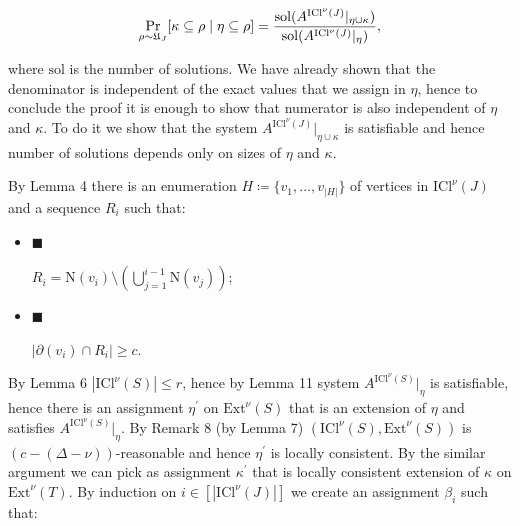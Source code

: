 \[\begin{gathered}
\Pr\limits_{\rho\sim\mathfrak{U}_{J}}[\kappa\subseteq\rho\mid\eta\subseteq\rho%
]=\frac{\mathrm{sol}(A^{\mathrm{ICl}^{\nu}\left(J\right)}|_{\eta\cup\kappa})}{%
\mathrm{sol}(A^{\mathrm{ICl}^{\nu}\left(J\right)}|_{\eta})},
\end{gathered}\]


where $\mathrm{sol}$ is the number of solutions. We have already shown that the denominator is
independent of the exact values that we assign in $\eta$, hence to conclude the proof it is enough to
show that numerator is also independent of $\eta$ and $\kappa$. To do it we show that the system
$A^{\mathrm{ICl}^{\nu}\left(J\right)}|_{\eta\cup\kappa}$ is satisfiable and hence number of solutions depends only
on sizes of $\eta$ and $\kappa$.\par




By Lemma 4 there is an enumeration $H\coloneqq\{v_{1},\dots,v_{|H|}\}$ of
vertices in $\mathrm{ICl}^{\nu}\left(J\right)$ and a sequence $R_{i}$ such that:\par


\begin{itemize}


\item[] 
$\blacksquare$ 


$R_{i}=\mathrm{N}\left(v_{i}\right)\setminus\left(\bigcup\limits_{j=1}^{i-1}%
\mathrm{N}\left(v_{j}\right)\right)$;\par





\item[] 
$\blacksquare$ 


$|\partial(v_{i})\cap R_{i}|\geq c$.\par





\end{itemize}




By Lemma 6 $|\mathrm{ICl}^{\nu}\left(S\right)|\leq r$, hence by Lemma 11
system $A^{\mathrm{ICl}^{\nu}\left(S\right)}|_{\eta}$ is satisfiable, hence there is an assignment $\eta^{\prime}$ on
$\mathrm{Ext}^{\nu}\left(S\right)$ that is an extension of $\eta$ and satisfies $A^{\mathrm{ICl}^{\nu}\left(S\right)}|_{\eta}$. By Remark
8 (by Lemma 7) $(\mathrm{ICl}^{\nu}\left(S\right),\mathrm{Ext}^{\nu}\left(S\right))$
is $(c-(\Delta-\nu))$-reasonable and hence $\eta^{\prime}$ is locally consistent. By the similar argument
we can pick as assignment $\kappa^{\prime}$ that is locally consistent extension of $\kappa$ on
$\mathrm{Ext}^{\nu}\left(T\right)$. By induction on $i\in[|\mathrm{ICl}^{\nu}\left(J\right)|]$ we create an assignment $\beta_{i}$ such
that:\par


